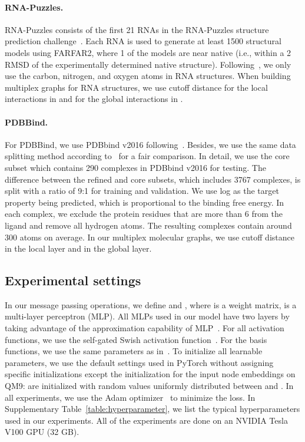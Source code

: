 \documentclass[fleqn,10pt]{wlscirep}
\begin{document}
\paragraph{RNA-Puzzles.} RNA-Puzzles consists of the first 21 RNAs in the RNA-Puzzles structure prediction challenge~\cite{miao2020rna}. Each RNA is used to generate at least 1500 structural models using FARFAR2, where 1 of the models are near native (i.e., within a 2 RMSD of the experimentally determined native structure). Following~\cite{townshend2021geometric}, we only use the carbon, nitrogen, and oxygen atoms in RNA structures. When building multiplex graphs for RNA structures, we use cutoff distance  for the local interactions in  and  for the global interactions in . 

\paragraph{PDBBind.} For PDBBind, we use PDBbind v2016 following~\cite{stepniewska2018development,li2021structure}. Besides, we use the same data splitting method according to~\cite{li2021structure} for a fair comparison. In detail, we use the core subset which contains 290 complexes in PDBbind v2016 for testing. The difference between the refined and core subsets, which includes 3767 complexes, is split with a ratio of 9:1 for training and validation. We use log as the target property being predicted, which is proportional to the binding free energy. In each complex, we exclude the protein residues that are more than 6 from the ligand and remove all hydrogen atoms. The resulting complexes contain around 300 atoms on average. In our multiplex molecular graphs, we use cutoff distance  in the local layer and  in the global layer.


\subsection*{Experimental settings}
In our message passing operations, we define  and , where  is a weight matrix,  is a multi-layer perceptron (MLP). All MLPs used in our model have two layers by taking advantage of the approximation capability of MLP~\cite{hornik1989multilayer}. For all activation functions, we use the self-gated Swish activation function~\cite{ramachandran2017searching}. For the basis functions, we use the same parameters as in~\cite{klicpera_dimenet_2020}. To initialize all learnable parameters, we use the default settings used in PyTorch without assigning specific initializations except the initialization for the input node embeddings on QM9:  are initialized with random values uniformly distributed between  and . 
In all experiments, we use the Adam optimizer~\cite{kingma2014adam} to minimize the loss. In Supplementary Table~\ref{table:hyperparameter}, we list the typical hyperparameters used in our experiments. All of the experiments are done on an NVIDIA Tesla V100 GPU (32 GB).
\end{document}
